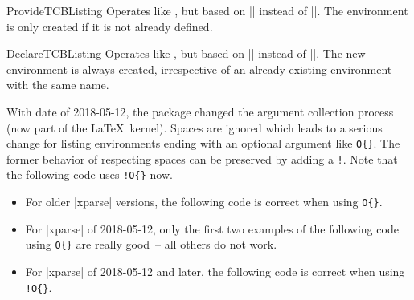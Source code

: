 \begin{docCommand}{ProvideTCBListing}{}
  Operates like , but based on |\ProvideDocumentEnvironment| instead of |\NewDocumentEnvironment|.
  The environment  is only created if it is not already defined.
\end{docCommand}

\begin{docCommand}{DeclareTCBListing}{}
  Operates like , but based on |\DeclareDocumentEnvironment| instead of |\NewDocumentEnvironment|.
  The new environment is always created, irrespective of an already existing
  environment with the same name.
\end{docCommand}

\clearpage

\begin{marker}
With date of 2018-05-12, the  \cite{latexproject:xparse} package
changed the argument collection process (now part of the \LaTeX\ kernel).
Spaces are ignored which leads to a serious change for listing environments
ending with an optional argument like \verb+O{}+.
The former behavior of respecting spaces can be preserved by adding a \flqq\verb+!+\frqq.
Note that the following code uses \verb+!O{}+ now.
\begin{itemize}
\item For older |xparse| versions, the following code is correct when using \verb+O{}+.
\item For |xparse| of 2018-05-12, only the first two examples of
  the following code using \verb+O{}+ are really \flqq good\frqq\ -- all others do not work.
\item For |xparse| of 2018-05-12 and later, the following code is correct when using \verb+!O{}+.
\end{itemize}
\end{marker}

